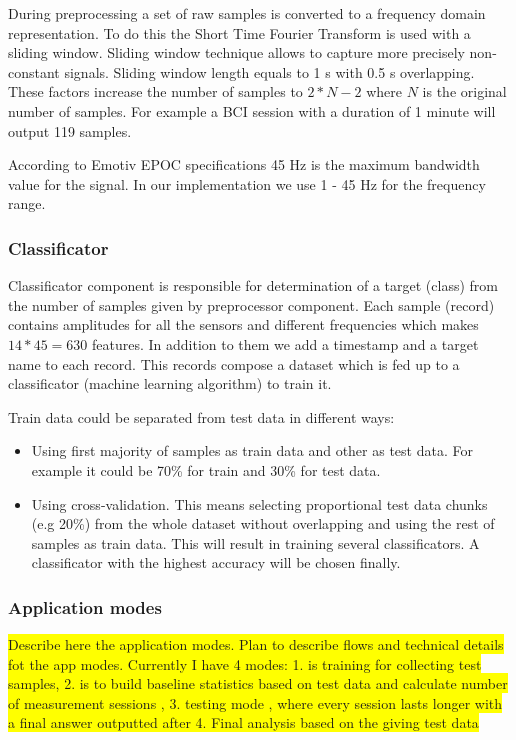 \documentclass[12pt]{article}
\begin{document}
During preprocessing a set of raw samples is converted to a frequency domain representation. To do this the Short Time Fourier Transform is used with a sliding window. Sliding window technique allows to capture more precisely non-constant signals. Sliding window length equals to 1 s with 0.5 s overlapping. These factors increase the number of samples to $2*N-2$ where $N$ is the original number of samples. For example a BCI session with a duration of 1 minute will output 119 samples.

According to Emotiv EPOC specifications\cite{emotiv} 45 Hz is the maximum bandwidth value for the signal. In our implementation we use 1 - 45 Hz for the frequency range.

\subsubsection{Classificator}

Classificator component is responsible for determination of a target (class) from the number of samples given by preprocessor component. Each sample (record) contains amplitudes for all the sensors and different frequencies which makes $14*45=630$ features. In addition to them we add a timestamp and a target name to each record. This records compose a dataset which is fed up to a classificator (machine learning algorithm) to train it. 

Train data could be separated from test data in different ways:

\begin{itemize}
\item Using first majority of samples as train data and other as test data. For example it could be 70\% for train and 30\% for test data.
\item Using cross-validation. This means selecting proportional test data chunks (e.g 20\%) from the whole dataset without overlapping and using the rest of samples as train data. This will result in training several classificators. A classificator with the highest accuracy will be chosen finally.
\end{itemize}

\subsubsection{Application modes}
\colorbox{yellow}{Describe here the application modes. Plan to describe flows and technical details fot the app modes. Currently I have 4 modes: 1. is training for collecting test samples, 2. is to build baseline statistics based on test data and calculate number of measurement sessions , 3. testing mode , where every session lasts longer with a final answer outputted after 4. Final analysis based on the giving test data}
\end{document}
